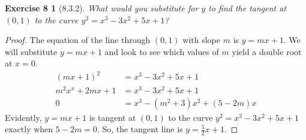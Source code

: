 \documentclass[12pt]{article}
\theoremstyle{plain}
\newtheorem*{ex8}{Exercise 8}
\begin{document}
\begin{ex8} [8.3.2]
  What would you substitute for $y$ to find the tangent at $(0,1)$ to the curve $y^2=x^3-3x^2+5x+1$?
\end{ex8}

\begin{proof}
  The equation of the line through $(0,1)$ with slope $m$ is $y=mx+1$. We will substitute $y=mx+1$ and look to see which values of $m$ yield a double root at $x=0$.
  \begin{align*}
    (mx+1)^2      &= x^3-3x^2+5x+1 \\
    m^2x^x+2mx+1  &= x^3-3x^2+5x+1 \\
    0             &= x^3-(m^2+3)x^2+(5-2m)x
  \end{align*}
  Evidently, $y=mx+1$ is tangent at $(0,1)$ to the curve $y^2=x^3-3x^2+5x+1$ exactly when $5-2m=0$. So, the tangent line is $y=\frac{5}{2}x+1$.
\end{proof}
\end{document}
